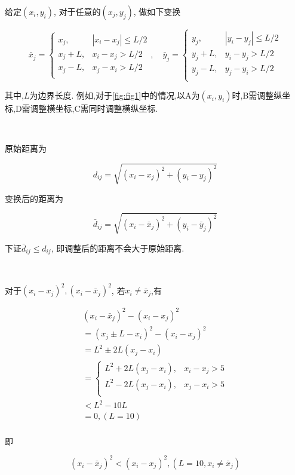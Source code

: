 \documentclass{article}
\begin{document}
给定$(x_i, y_i)$, 对于任意的$(x_j, y_j)$, 做如下变换

\begin{equation}\label{eq:eq1}
	\bar{x}_j=\begin{cases}
		x_j,&		|x_i-x_j|\le L/2\\
		x_j+L,&		x_i-x_j>L/2\\
		x_j-L,&		x_j-x_i>L/2\\
	\end{cases} ,\quad
	\bar{y}_j=\begin{cases}
		y_j,&		|y_i-y_j|\le L/2\\
		y_j+L,&		y_i-y_j>L/2\\
		y_j-L,&		y_j-y_i>L/2\\
	\end{cases}
\end{equation}

其中,$L$为边界长度. 例如,对于\ref{fig:fig1}中的情况,以A为$(x_i, y_i)$时,B需调整纵坐标,D需调整横坐标,C需同时调整横纵坐标.

$\ $

原始距离为

$$
d_{ij}=\sqrt{(x_i-x_j)^2+(y_i-y_j)^2}
$$

变换后的距离为

$$
\bar{d}_{ij}=\sqrt{(x_i-\bar{x}_j)^2+(y_i-\bar{y}_j)^2}
$$

下证$\bar{d}_{ij} \le d_{ij}$, 即调整后的距离不会大于原始距离.

$ $

对于$(x_i-x_j)^2, (x_i-\bar{x}_j)^2$, 若$x_i\ne \bar{x}_j$,有

$$
\begin{array}{l}
	(x_i-\bar{x}_j)^2-(x_i-x_j)^2\\
	=\left( x_j\pm L-x_i \right) ^2-(x_i-x_j)^2\\
	=L^2\pm 2L\left( x_j-x_i \right)\\
	=\left\{ \begin{matrix}
	L^2+2L\left( x_j-x_i \right) ,&		x_i-x_j>5\\
	L^2-2L\left( x_j-x_i \right) ,&		x_j-x_i>5\\
\end{matrix} \right.\\
	<L^2-10L\\
	=0, \left( L=10 \right)\\
\end{array}
$$

即

$$
(x_i-\bar{x}_j)^2<(x_i-x_j)^2, \left( L=10, x_i\ne \bar{x}_j \right)
$$
\end{document}
